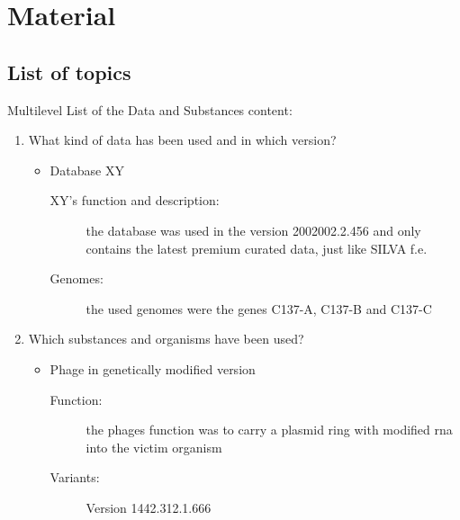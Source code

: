 \chapter{Material}
\section{List of topics}
\label{Topics_of_Material}
Multilevel List of the Data and Substances content:
\begin{enumerate}
   \item What kind of data has been used and in which version?
   \begin{itemize}
     \item Database XY
     \begin{description}
	 \item[XY's function and description:] the database was used in the version
			 2002002.2.456 and only contains the latest premium curated data,
			 just like SILVA f.e. 
     \item [Genomes:] the used genomes were the genes C137-A, C137-B and C137-C
     \end{description}
   \end{itemize}
   \item Which substances and organisms have been used? 
   \begin{itemize}
     \item Phage in genetically modified version 
     \begin{description}
	 \item [Function:] the phages function was to carry a plasmid ring with
			 modified rna into the victim organism 
	 \item [Variants:] Version 1442.312.1.666
     \end{description}
   \end{itemize}
\end{enumerate}
